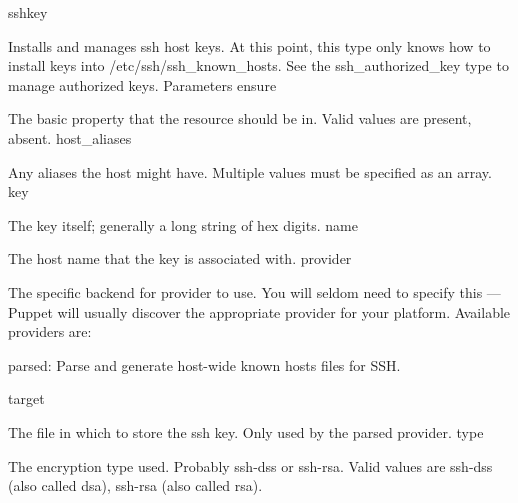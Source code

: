 sshkey

Installs and manages ssh host keys. At this point, this type only knows how to install keys into /etc/ssh/ssh_known_hosts. See the ssh_authorized_key type to manage authorized keys.
Parameters
ensure

The basic property that the resource should be in. Valid values are present, absent.
host_aliases

Any aliases the host might have. Multiple values must be specified as an array.
key

The key itself; generally a long string of hex digits.
name

The host name that the key is associated with.
provider

The specific backend for provider to use. You will seldom need to specify this — Puppet will usually discover the appropriate provider for your platform. Available providers are:

    parsed: Parse and generate host-wide known hosts files for SSH.

target

The file in which to store the ssh key. Only used by the parsed provider.
type

The encryption type used. Probably ssh-dss or ssh-rsa. Valid values are ssh-dss (also called dsa), ssh-rsa (also called rsa).
